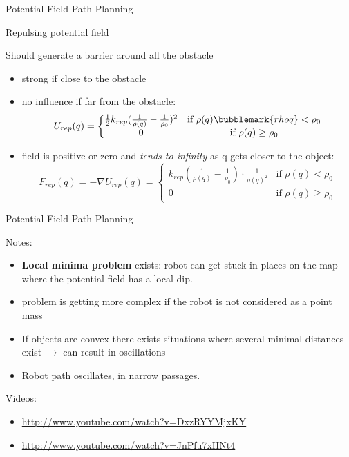 \documentclass[compress,xcolor=table]{beamer}
\begin{document}
\begin{frame}{Potential Field Path Planning}

Repulsing potential field

Should generate a barrier around all the obstacle

\begin{itemize}
\item strong if close to the obstacle
\item no influence if far from the obstacle:
    \[
        U_{rep}(q) = \left\{\begin{matrix}
                            \frac{1}{2}k_{rep}(\frac{1}{\rho(q)} -
                            \frac{1}{\rho_0})^2 &  \text{if }
                            \rho(q)\bubblemark{rhoq} <  \rho_0 \\ 
                            0 & \text{if } \rho(q) \geq \rho_0 
                        \end{matrix}\right.
    \]
\item field is positive or zero and \emph{tends to infinity} as q gets
  closer to the object:
    \[
        F_{rep}(q) = -\nabla U_{rep}(q) = \left\{\begin{matrix}
            k_{rep}(\frac{1}{\rho(q)} - \frac{1}{\rho_0}) \cdot \frac{1}{\rho(q)^2} &  \text{if }  \rho(q) <  \rho_0 \\ 
                                              0 & \text{if } \rho(q) \geq \rho_0 
                                          \end{matrix}\right.
    \]
\end{itemize}

\end{frame}

\begin{frame}{Potential Field Path Planning}

    Notes:

    \begin{itemize}
        \item \textbf{Local minima problem} exists: robot can get stuck in places on the map
            where the potential field has a local dip.
        \item problem is getting more complex if the robot is not considered as a
            point mass
        \item If objects are convex there exists situations where several minimal
            distances exist $\rightarrow$ can result in oscillations
        \item Robot path oscillates, \eg in narrow passages.
    \end{itemize}


    Videos:

    \begin{itemize}
        \item \url{http://www.youtube.com/watch?v=DxzRYYMjxKY}
        \item \url{http://www.youtube.com/watch?v=JnPfu7xHNt4}
    \end{itemize}

\end{frame}
\end{document}

